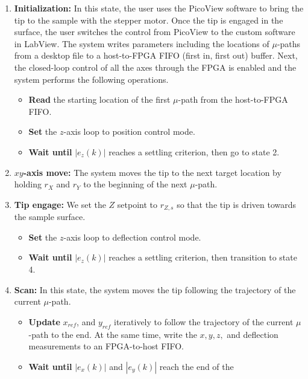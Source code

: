 




\begin{enumerate}
\item \textbf{Initialization:} In this state, the user uses the PicoView
  software to bring the tip to the sample with the stepper motor. Once the tip
  is engaged in the surface, the user switches the control from PicoView to the
  custom software in LabView. The system writes parameters including the
  locations of $\mu$-paths from a desktop file to a host-to-FPGA FIFO (first in,
  first out) buffer. Next, the closed-loop control of all the axes through the
  FPGA is enabled and the system performs the following operations.
  \begin{itemize}
  \item \textbf{Read} the starting location of the first $\mu$-path from the
    host-to-FPGA FIFO.
  \item \textbf{Set} the $z$-axis loop to position control mode.
  \item \textbf{Wait until} $|e_z(k)|$ reaches a settling criterion, then go to
    state 2.
  \end{itemize}
\item \textbf{$xy$-axis move:} The system moves the tip to the next target
  location by holding $r_X$ and $r_Y$ to the beginning of the next $\mu$-path.
\item \textbf{Tip engage:} We set the $Z$ setpoint to $r_{Z,s}$ so that the
  tip is driven towards the sample surface. 
  \begin{itemize}
  \item \textbf{Set} the $z$-axis loop to deflection control mode.
  \item \textbf{Wait until} $|e_z(k)|$ reaches a settling criterion, then
    transition to state 4. 
  \end{itemize}
\item \textbf{Scan:} In this state, the system moves the tip following the
  trajectory of the current $\mu$-path.
  \begin{itemize}
  \item \textbf{Update} $x_{ref}$, and $y_{ref}$ iteratively to follow the
    trajectory of the current $\mu$-path to the end. At the same time, write the
    $x,y,z,$ and deflection measurements to an FPGA-to-host FIFO.
  \item \textbf{Wait until} $|e_x(k)|$ and $|e_y(k)|$ reach the end of the

\end{itemize}
\end{enumerate}
